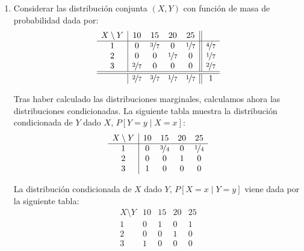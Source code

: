 \begin{ejercicio}
\begin{enumerate}
        \item Considerar las distribución conjunta $(X,Y)$ con función de masa de probabilidad dada por:
        \begin{equation*}
            \begin{array}{c|cccc||c}
                X\setminus Y & 10 & 15 & 20 & 25 &\\
                \hline
                1 & 0 & \nicefrac{3}{7} & 0 & \nicefrac{1}{7} & \nicefrac{4}{7}\\
                2 & 0 & 0 & \nicefrac{1}{7} & 0 & \nicefrac{1}{7}\\
                3 & \nicefrac{2}{7} & 0 & 0 & 0 & \nicefrac{2}{7}\\
                \hline \hline
                & \nicefrac{2}{7} & \nicefrac{3}{7} & \nicefrac{1}{7} & \nicefrac{1}{7} & 1
            \end{array}
        \end{equation*}

        Tras haber calculado las distribuciones marginales, calculamos ahora las distribuciones condicionadas.
        La siguiente tabla muestra la distribución condicionada de $Y$ dado $X$, $P[Y = y\mid X = x]$:
        \begin{equation*}
            \begin{array}{c|cccc}
                X\setminus Y & 10 & 15 & 20 & 25\\
                \hline
                1 & 0 & \nicefrac{3}{4} & 0 & \nicefrac{1}{4}\\
                2 & 0 & 0 & 1 & 0\\
                3 & 1 & 0 & 0 & 0
            \end{array}
        \end{equation*}

        La distribución condicionada de $X$ dado $Y$, $P[X = x\mid Y = y]$ viene dada por la siguiente tabla:
        \begin{equation*}
            \begin{array}{c|cccc}
                X\setminus Y & 10 & 15 & 20 & 25\\
                \hline
                1 & 0 & 1 & 0 & 1\\
                2 & 0 & 0 & 1 & 0\\
                3 & 1 & 0 & 0 & 0
            \end{array}
        \end{equation*}


\end{enumerate}
\end{ejercicio}

